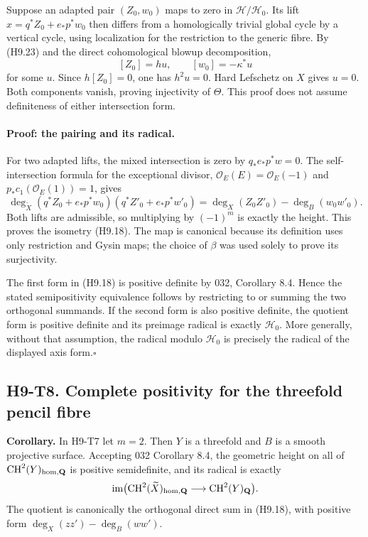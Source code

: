 \documentclass[11pt,a4paper]{article}
\begin{document}
Suppose an adapted pair $(Z_0,w_0)$ maps to zero in
$\mathcal H/\mathcal H_0$. Its lift
$x=q^*Z_0+e_*p^*w_0$ then differs from a homologically trivial global
cycle by a vertical cycle, using localization for the restriction to
the generic fibre. By (H9.23) and the direct cohomological blowup
decomposition,
\[
 [Z_0]=h u,\qquad [w_0]=-\kappa^*u
\]
for some $u$. Since $h[Z_0]=0$, one has $h^2u=0$.
Hard Lefschetz on $X$ gives $u=0$. Both components vanish, proving
injectivity of $\Theta$. This proof does not assume definiteness of
either intersection form.

\paragraph{Proof: the pairing and its radical.}
For two adapted lifts, the mixed intersection is zero by
$q_*e_*p^*w=0$. The self-intersection formula for the exceptional
divisor, $\mathcal O_E(E)=\mathcal O_E(-1)$ and
$p_*c_1(\mathcal O_E(1))=1$, gives
\[
 \deg_{\widetilde X}
  (q^*Z_0+e_*p^*w_0)(q^*Z'_0+e_*p^*w'_0)
   =\deg_X(Z_0Z'_0)-\deg_B(w_0w'_0).                          \tag{H9.24}
\]
Both lifts are admissible, so multiplying by $(-1)^m$ is exactly the
height. This proves the isometry (H9.18). The map is canonical because
its definition uses only restriction and Gysin maps; the choice of
$\beta$ was used solely to prove its surjectivity.

The first form in (H9.18) is positive definite by 032, Corollary 8.4.
Hence the stated semipositivity equivalence follows by restricting to
or summing the two orthogonal summands. If the second form is also
positive definite, the quotient form is positive definite and its
preimage radical is exactly $\mathcal H_0$. More generally, without
that assumption, the radical modulo $\mathcal H_0$ is precisely the
radical of the displayed axis form.\hfill$\square$

\subsection*{H9-T8. Complete positivity for the threefold pencil fibre}

\textbf{Corollary.} In H9-T7 let $m=2$. Then $Y$ is a threefold and
$B$ is a smooth projective surface. Accepting 032 Corollary 8.4, the
geometric height on all of $\operatorname{CH}^2(Y)_{\rm hom,\mathbf Q}$
is positive semidefinite, and its radical is exactly
\[
 \operatorname{im}\bigl(\operatorname{CH}^2(\widetilde X)_{
       \rm hom,\mathbf Q}\longrightarrow
       \operatorname{CH}^2(Y)_{\mathbf Q}\bigr).
\]
The quotient is canonically the orthogonal direct sum in (H9.18), with
positive form $\deg_X(zz')-\deg_B(ww')$.
\end{document}
